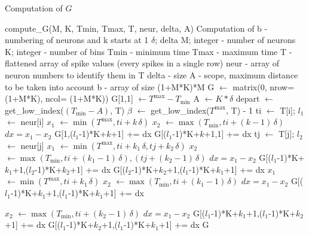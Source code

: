 \documentclass{article}
\def\Tmin{T_{\min}}
\def\Tmax{T^{\max}}
\begin{document}
\clearpage
\begin{algorithm}[!h]
\caption{Computation of $G$}
\begin{algorithmic}[1] 
\Use compute\_G(M, K, Tmin, Tmax, T, neur, delta, A)
  \Desc Computation of b - numbering of neurons and k starts at 1
\Input $\delta$; delta 
  \Input M; integer - number of neurons
  \Input K; integer - number of bins
\Input Tmin - minimum time
\Input Tmax - maximum time
\Input T - flattened array of spike values (every spikes in a single row)
\Input neur - array of neuron numbers to identify them in T
\Input delta - size
\Input A - scope, maximum distance to be taken into account
\Output b - array of size (1+M*K)*M%
\State G $\gets$ matrix(0, nrow=(1+M*K), ncol= (1+M*K)) 
\State G[1,1] $\gets \Tmax - \Tmin$
\State A $\gets K*\delta$ 
\State depart $\gets$ get\_low\_index($(\Tmin-A)$, T)
\State $\beta$ $\gets$ get\_low\_index($\Tmax$, T) - 1
\State ti $\gets$ T[i]; $l_1$ $\gets$ neur[i]
 
\State $x_1$ $\gets \min{(\Tmax, ti+k\,\delta)}$
\State $x_2$ $\gets \max{(\Tmin, ti+(k-1)\,\delta)}$
\State $dx = x_1 - x_2$
\State G[1,($l_1$-1)*K+$k$+1] += dx
\State G[($l_1$-1)*K+$k$+1,1] += dx
\EndIf
\EndFor
{} 
\State tj $\gets$ T[j]; $l_2$ $\gets$ neur[j]
\State $x_1$ $\gets \min{(\Tmax, ti+k_1\,\delta, tj+k_2\,\delta)}$
\State $x_2$ $\gets \max{(\Tmin, ti+(k_1-1)\,\delta), (tj+(k_2-1)\,\delta)}$
\State $dx = x_1 - x_2$
\State G[($l_1$-1)*K+$k_1$+1,($l_2$-1)*K+$k_2$+1] += dx
\State G[($l_2$-1)*K+$k_2$+1,($l_1$-1)*K+$k_1$+1] += dx
\EndIf
\EndFor
\EndFor
\EndFor
{} 
\State $x_1$ $\gets \min{(\Tmax, ti+k_1\,\delta)}$
\State $x_2$ $\gets \max{(\Tmin, ti+(k_1-1)\,\delta)}$
\State $dx = x_1 - x_2$
 
\State G[($l_1$-1)*K+$k_1$+1,($l_1$-1)*K+$k_1$+1] += dx
\EndIf
{}
\end{algorithmic}
\end{algorithm}
\begin{algorithm}[!h]
\begin{algorithmic}[1] 
 
\State $x_2$ $\gets \max{(\Tmin, ti+(k_2-1)\,\delta)}$
\State $dx = x_1 - x_2$
\State G[($l_1$-1)*K+$k_1$+1,($l_1$-1)*K+$k_2$+1] += dx
\State G[($l_1$-1)*K+$k_2$+1,($l_1$-1)*K+$k_1$+1] += dx
\EndIf
\EndFor
\EndFor
\EndFor
\State \Return G
\end{algorithmic}
\end{algorithm}
\end{document}
